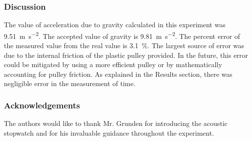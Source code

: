 \documentclass{beamer}
\begin{document}
\begin{frame}
    \frametitle{Discussion}
    The value of acceleration due to gravity calculated in this experiment was
    \qty{9.51}{\meter\per\second\squared}. The accepted value of gravity is
    \qty{9.81}{\meter\per\second\squared}. The percent error of the measured
    value from the real value is \qty{3.1}{\percent}. The largest source of
    error was due to the internal friction of the plastic pulley provided. In
    the future, this error could be mitigated by using a more efficient pulley
    or by mathematically accounting for pulley friction. As explained in the
    Results section, there was negligible error in the measurement of time.
\end{frame}

\begin{frame}
    \frametitle{Acknowledgements}
    The authors would like to thank Mr. Grunden for introducing the acoustic
    stopwatch and for his invaluable guidance throughout the experiment.
\end{frame}
\end{document}
